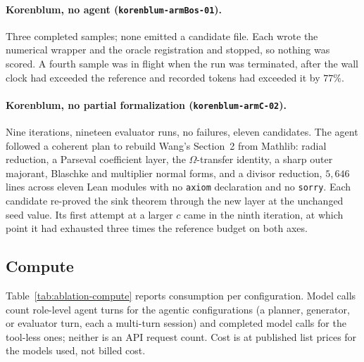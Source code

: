 \paragraph{Korenblum, no agent (\texttt{korenblum-armBos-01}).}
Three completed samples; none emitted a candidate file. Each wrote the
numerical wrapper and the oracle registration and stopped, so nothing was
scored. A fourth sample was in flight when the run was terminated, after the
wall clock had exceeded the reference and recorded tokens had exceeded it by
$77\%$.

\paragraph{Korenblum, no partial formalization (\texttt{korenblum-armC-02}).}
Nine iterations, nineteen evaluator runs, no failures, eleven candidates. The
agent followed a coherent plan to rebuild Wang's Section~2 from Mathlib: radial
reduction, a Parseval coefficient layer, the $\Omega$-transfer identity, a sharp
outer majorant, Blaschke and multiplier normal forms, and a divisor reduction,
$5{,}646$ lines across eleven Lean modules with no \texttt{axiom} declaration
and no \texttt{sorry}. Each candidate re-proved the sink theorem through the new
layer at the unchanged seed value. Its first attempt at a larger $c$ came in
the ninth iteration, at which point it had exhausted three times the reference
budget on both axes.

\subsection{Compute}

Table~\ref{tab:ablation-compute} reports consumption per configuration. Model
calls count role-level agent turns for the agentic configurations (a planner,
generator, or evaluator turn, each a multi-turn session) and completed model
calls for the tool-less ones; neither is an API request count. Cost is at
published list prices for the models used, not billed cost.


